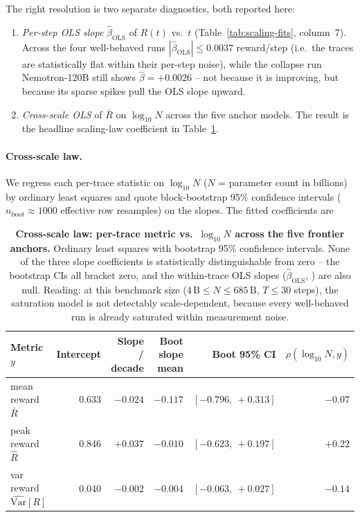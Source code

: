 The right resolution is two separate diagnostics, both reported
here:

\begin{enumerate}
  \item \emph{Per-step OLS slope} $\hat\beta_{\text{OLS}}$ of
    $R(t)$ vs.~$t$ (Table~\ref{tab:scaling-fits}, column~7).
    Across the four well-behaved runs
    $|\hat\beta_{\text{OLS}}| \le 0.0037$ reward/step (i.e.\ the
    traces are statistically flat within their per-step noise),
    while the collapse run Nemotron-120B still shows $\hat\beta
    = +0.0026$ -- not because it is improving, but because its
    sparse spikes pull the OLS slope upward.
  \item \emph{Cross-scale OLS} of $\bar R$ on $\log_{10} N$
    across the five anchor models.  The result is the headline
    scaling-law coefficient in
    Table~\ref{tab:scaling-cross}.
\end{enumerate}

\paragraph{Cross-scale law.}
\label{par:cross-scale}
We regress each per-trace statistic on $\log_{10} N$
(\(N\) = parameter count in billions) by ordinary least squares and
quote block-bootstrap 95\% confidence intervals
($n_{\text{boot}} \approx 1000$ effective row resamples) on
the slopes.  The fitted coefficients are

\begin{table}[t]
  \centering
  \small
  \begin{tabular}{lrrrrr}
    \toprule
    Metric $y$ & Intercept & Slope / decade &
                  Boot slope mean & Boot 95\% CI &
                  $\rho(\log_{10} N, y)$ \\
    \midrule
    mean reward $\bar R$  & 0.633 & $-0.024$ & $-0.117$ & $[-0.796,\ +0.313]$ & $-0.07$ \\
    peak reward $\hat R$  & 0.846 & $\mathbf{+0.037}$ & $-0.010$ & $[-0.623,\ +0.197]$ & $+0.22$ \\
    var reward $\widehat{\text{Var}}[R]$ & 0.040 & $-0.002$ & $-0.004$ & $[-0.063,\ +0.027]$ & $-0.14$ \\
    \bottomrule
  \end{tabular}
  \caption{\textbf{Cross-scale law: per-trace metric vs.~$\log_{10} N$
    across the five frontier anchors.}
    Ordinary least squares with bootstrap 95\% confidence intervals.
    None of the three slope coefficients is statistically
    distinguishable from zero -- the bootstrap CIs all bracket zero,
    and the within-trace OLS slopes
    ($\hat\beta_{\text{OLS}}$, ) are
    also null.  Reading: at this benchmark size ($4\,\text{B}
    \le N \le 685\,\text{B}$, $T\!\le\!30$ steps), the saturation
    model is not detectably scale-dependent, because every
    well-behaved run is already saturated within measurement noise.}
  \label{tab:scaling-cross}
\end{table}

